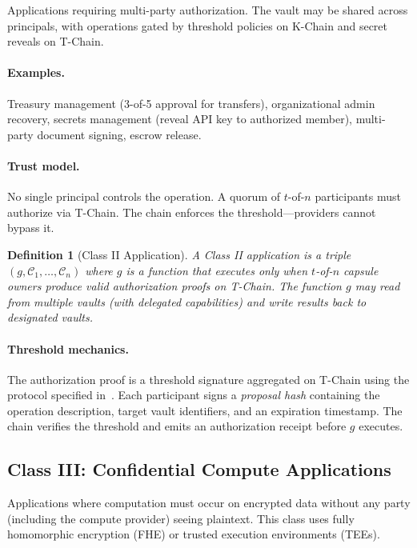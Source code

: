 \documentclass[11pt,a4paper]{article}
\newtheorem{definition}{Definition}[section]
\begin{document}
Applications requiring multi-party authorization. The vault may be shared across
principals, with operations gated by threshold policies on K-Chain and secret
reveals on T-Chain.

\paragraph{Examples.} Treasury management (3-of-5 approval for transfers),
organizational admin recovery, secrets management (reveal API key to authorized
member), multi-party document signing, escrow release.

\paragraph{Trust model.} No single principal controls the operation. A quorum
of $t$-of-$n$ participants must authorize via T-Chain. The chain enforces the
threshold---providers cannot bypass it.

\begin{definition}[Class II Application]\label{def:class2}
A Class II application is a triple $(g, \mathcal{C}_1, \ldots, \mathcal{C}_n)$
where $g$ is a function that executes only when $t$-of-$n$ capsule owners
produce valid authorization proofs on T-Chain. The function $g$ may read from
multiple vaults (with delegated capabilities) and write results back to
designated vaults.
\end{definition}

\paragraph{Threshold mechanics.} The authorization proof is a threshold signature
aggregated on T-Chain using the protocol specified in~\cite{lux-mchain-mpc}.
Each participant signs a \textit{proposal hash} containing the operation
description, target vault identifiers, and an expiration timestamp. The chain
verifies the threshold and emits an authorization receipt before $g$ executes.

\subsection{Class III: Confidential Compute Applications}\label{sec:class3}

Applications where computation must occur on encrypted data without any party
(including the compute provider) seeing plaintext. This class uses fully
homomorphic encryption (FHE) or trusted execution environments (TEEs).
\end{document}

